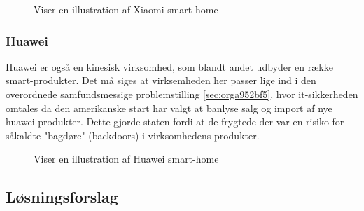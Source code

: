 \documentclass[11pt]{article}
\begin{document}
\begin{figure}[htbp]
\centering
{}
\caption{Viser en illustration af Xiaomi smart-home}
\end{figure}

\subsubsection{Huawei}
Huawei er også en kinesisk virksomhed, som blandt andet udbyder en række smart-produkter. Det må siges at virksemheden her passer lige ind i den overordnede samfundsmessige problemstilling \ref{sec:orga952bf5}, hvor it-sikkerheden omtales da den amerikanske start har valgt at banlyse salg og import af nye huawei-produkter. Dette gjorde staten fordi at de frygtede der var en risiko for såkaldte "bagdøre" (backdoors) i virksomhedens produkter.
\begin{figure}[htbp]
\centering
{}
\caption{Viser en illustration af Huawei smart-home}
\end{figure}

\subsection{Løsningsforslag}
\label{sec:loesningsforslag}
\end{document}
